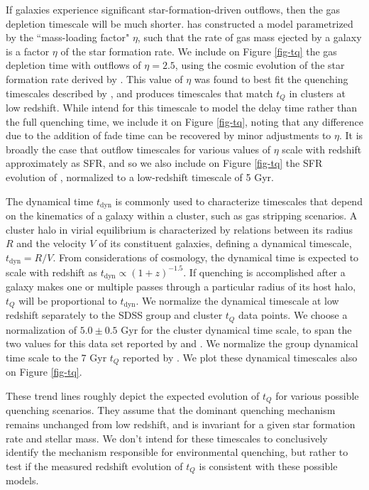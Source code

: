 If galaxies experience significant star-formation-driven outflows, then the gas depletion timescale will be much shorter.
\citet{McGee:2014aa} has constructed a model parametrized by the ``mass-loading factor" $\eta$, such that the rate of gas mass ejected by a galaxy is a factor $\eta$ of the star formation rate.
We include on Figure \ref{fig-tq} the gas depletion time with outflows of $\eta=2.5$, using the cosmic evolution of the star formation rate derived by \citet{Whitaker:2012aa}.
This value of $\eta$ was found to best fit the quenching timescales described by \citet{McGee:2014aa}, and produces timescales that match $t_Q$ in clusters at low redshift.
While \citet{McGee:2014aa} intend for this timescale to model the delay time rather than the full quenching time, we include it on Figure \ref{fig-tq}, noting that any difference due to the addition of fade time can be recovered by minor adjustments to $\eta$.
It is broadly the case that outflow timescales for various values of $\eta$ scale with redshift approximately as SFR, and so we also include on Figure \ref{fig-tq} the SFR evolution of \citet{Whitaker:2012aa}, normalized to a low-redshift timescale of 5 Gyr.

The dynamical time $t_{\mathrm{dyn}}$ is commonly used to characterize timescales that depend on the kinematics of a galaxy within a cluster, such as gas stripping scenarios.
A cluster halo in virial equilibrium is characterized by relations between its radius $R$ and the velocity $V$ of its constituent galaxies, defining a dynamical timescale, $t_{\mathrm{dyn}}=R/V$.
From considerations of cosmology, the dynamical time is expected to scale with redshift as $t_{\mathrm{dyn}} \propto (1+z)^{-1.5}$.
If quenching is accomplished after a galaxy makes one or multiple passes through a particular radius of its host halo, $t_Q$ will be proportional to $t_{\mathrm{dyn}}$.
We normalize the dynamical timescale at low redshift separately to the SDSS group and cluster $t_Q$ data points.
We choose a normalization of $5.0\pm0.5$ Gyr for the cluster dynamical time scale, to span the two values for this data set reported by \citet{Wetzel:2013aa} and \citet{Balogh:2016aa}.
We normalize the group dynamical time scale to the 7 Gyr $t_Q$ reported by \citet{Balogh:2016aa}.
We plot these dynamical timescales also on Figure \ref{fig-tq}.

These trend lines roughly depict the expected evolution of $t_Q$ for various possible quenching scenarios.
They assume that the dominant quenching mechanism remains unchanged from low redshift, and is invariant for a given star formation rate and stellar mass.
We don't intend for these timescales to conclusively identify the mechanism responsible for environmental quenching, but rather to test if the measured redshift evolution of $t_Q$ is consistent with these possible models.


